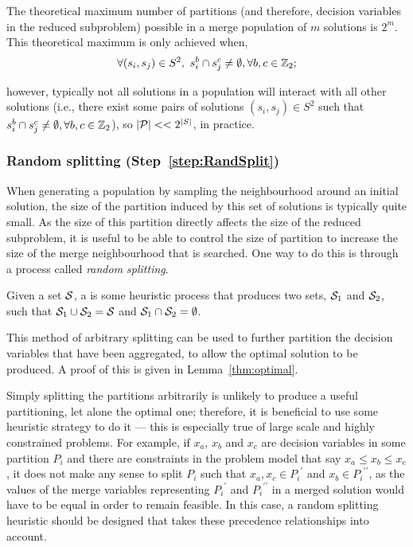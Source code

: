 \documentclass[journal]{IEEEtran}
\begin{document}
The theoretical maximum number of partitions (and therefore, decision variables in the reduced subproblem) possible in a merge population of $m$ solutions is $2^m$. This theoretical maximum is only achieved when,
\begin{equation*}
\forall (s_i,s_j) \in S^2,\ s^b_i \cap s^c_j \neq \emptyset, \forall b,c \in \Bin; \label{sec:merge:part:bound}
\end{equation*}

however, typically not all solutions in a population will interact with all other solutions (i.e., there exist some pairs of solutions $(s_i,s_j) \in S^2$ such that $s^b_i \cap s^c_j \neq \emptyset, \forall b,c \in \Bin$), so $|{\cal P}| << 2^{|S|}$, in practice.

\subsubsection*{Random splitting (Step~\ref{step:RandSplit})}

When generating a population by sampling the neighbourhood around an initial solution, the size of the partition induced by this set of solutions is typically quite small. As the size of this partition directly affects the size of the reduced subproblem, it is useful to be able to control the size of partition to increase the size of the merge neighbourhood that is searched. One way to do this is through a process called \emph{random splitting}. 
%
\begin{definition}\label{def:split}
Given a set $\S{S}$, a  is some heuristic process that produces two sets, $\S{S}_1$ and $\S{S}_2$, such that $\S{S}_1 \cup \S{S}_2 = \S{S}$ and $\S{S}_1 \cap \S{S}_2 = \emptyset$.
\end{definition}
%
This method of arbitrary splitting can be used to further partition the decision variables that have been aggregated, to allow the optimal solution to be produced. A proof of this is given in Lemma~\ref{thm:optimal}. 

Simply splitting the partitions arbitrarily is unlikely to produce a useful partitioning, let alone the optimal one; therefore, it is beneficial to use some heuristic strategy to do it --- this is especially true of large scale and highly constrained problems. For example, if $x_a$, $x_b$ and $x_c$ are decision variables in some partition $P_i$ and there are constraints in the problem model that say $x_a \leq x_b \leq x_c$, it does not make any sense to split $P_i$ such that $x_a,x_c \in {P_i}^\prime$ and $x_b \in {P_i}^{\prime\prime}$, as the values of the merge variables representing ${P_i}^\prime$ and ${P_i}^{\prime\prime}$ in a merged solution would have to be equal in order to remain feasible. In this case, a random splitting heuristic should be designed that takes these precedence relationships into account.
\end{document}
